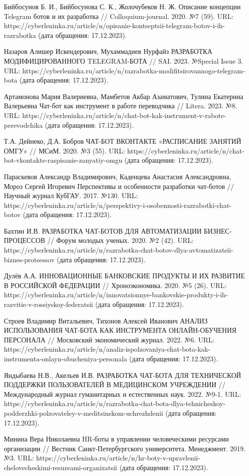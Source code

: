 \documentclass{article}
\begin{document}
Бийбосунов Б. И., Бийбосунова С. К., Жолочубеков Н. Ж. Описание концепции Telegram ботов и их разработка // Colloquium-journal. 2020. №7 (59). URL: https://cyberleninka.ru/article/n/opisanie-kontseptsii-telegram-botov-i-ih-razrabotka (дата обращения: 17.12.2023).

Назаров Алишер Искендерович, Мухаммадиев Нурфайз РАЗРАБОТКА МОДИФИЦИРОВАННОГО TELEGRAM-БОТА // SAI. 2023. №Special Issue 3. URL: https://cyberleninka.ru/article/n/razrabotka-modifitsirovannogo-telegram-bota (дата обращения: 17.12.2023).

Артамонова Мария Валериевна, Мамбетов Акбар Азаматович, Тулина Екатерина Валерьевна Чат-бот как инструмент в работе переводчика // Litera. 2023. №8. URL: https://cyberleninka.ru/article/n/chat-bot-kak-instrument-v-rabote-perevodchika (дата обращения: 17.12.2023).

Т.А. Дейнеко, Д.А. Бобров ЧАТ-БОТ ВКОНТАКТЕ «РАСПИСАНИЕ ЗАНЯТИЙ ОМГУ» // МСиМ. 2020. №3 (55). URL: https://cyberleninka.ru/article/n/chat-bot-vkontakte-raspisanie-zanyatiy-omgu (дата обращения: 17.12.2023).

Параскевов Александр Владимирович, Каденцева Анастасия Александровна, Мороз Сергей Игоревич Перспективы и особенности разработки чат-ботов // Научный журнал КубГАУ. 2017. №130. URL: https://cyberleninka.ru/article/n/perspektivy-i-osobennosti-razrabotki-chat-botov (дата обращения: 17.12.2023).

Бахтин И.В. РАЗРАБОТКА ЧАТ-БОТОВ ДЛЯ АВТОМАТИЗАЦИИ БИЗНЕС- ПРОЦЕССОВ // Форум молодых ученых. 2020. №2 (42). URL: https://cyberleninka.ru/article/n/razrabotka-chat-botov-dlya-avtomatizatsii-biznes-protsessov (дата обращения: 17.12.2023).

Дулёв А.А. ИННОВАЦИОННЫЕ БАНКОВСКИЕ ПРОДУКТЫ И ИХ РАЗВИТИЕ В РОССИЙСКОЙ ФЕДЕРАЦИИ // Хроноэкономика. 2020. №5 (26). URL: https://cyberleninka.ru/article/n/innovatsionnye-bankovskie-produkty-i-ih-razvitie-v-rossiyskoy-federatsii (дата обращения: 17.12.2023).

Строев Владимир Витальевич, Тихонов Алексей Иванович АНАЛИЗ ИСПОЛЬЗОВАНИЯ ЧАТ-БОТА КАК ИНСТРУМЕНТА ОНЛАЙН-ОБУЧЕНИЯ ПЕРСОНАЛА // Московский экономический журнал. 2022. №6. URL: https://cyberleninka.ru/article/n/analiz-ispolzovaniya-chat-bota-kak-instrumenta-onlayn-obucheniya-personala (дата обращения: 17.12.2023).

Яндыбаева Н.В., Акельев И.В. РАЗРАБОТКА ЧАТ-БОТА ДЛЯ ТЕХНИЧЕСКОЙ ПОДДЕРЖКИ ПОЛЬЗОВАТЕЛЕЙ В МЕДИЦИНСКОМ УЧРЕЖДЕНИИ // Международный журнал гуманитарных и естественных наук. 2022. №9-1. URL: https://cyberleninka.ru/article/n/razrabotka-chat-bota-dlya-tehnicheskoy-podderzhki-polzovateley-v-meditsinskom-uchrezhdenii (дата обращения: 17.12.2023).

Минина Вера Николаевна HR-боты в управлении человеческими ресурсами организации // Вестник Санкт-Петербургского университета. Менеджмент. 2019. №3. URL: https://cyberleninka.ru/article/n/hr-boty-v-upravlenii-chelovecheskimi-resursami-organizatsii (дата обращения: 17.12.2023).
\end{document}
